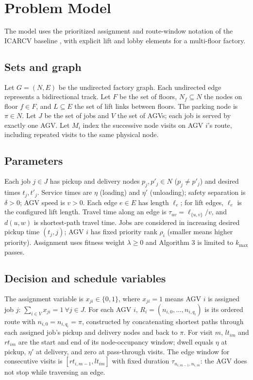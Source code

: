 \section{Problem Model}
\label{sec:model}

The model uses the prioritized assignment and route-window notation of the ICARCV baseline \cite{guo2024}, with explicit lift and lobby elements for a multi-floor factory.

\subsection{Sets and graph}
Let $G=(N,E)$ be the undirected factory graph. Each undirected edge represents a bidirectional track. Let $F$ be the set of floors, $N_f\subseteq N$ the nodes on floor $f\in F$, and $L\subseteq E$ the set of lift links between floors. The parking node is $\pi\in N$. Let $J$ be the set of jobs and $V$ the set of AGVs; each job is served by exactly one AGV. Let $M_i$ index the successive node visits on AGV $i$'s route, including repeated visits to the same physical node.

\subsection{Parameters}
Each job $j\in J$ has pickup and delivery nodes $p_j,p'_j\in N$ ($p_j\ne p'_j$) and desired times $t_j,t'_j$. Service times are $\eta$ (loading) and $\eta'$ (unloading); safety separation is $\delta>0$; AGV speed is $v>0$. Each edge $e\in E$ has length $\ell_e$; for lift edges, $\ell_e$ is the configured lift length. Travel time along an edge is $\tau_{uv}=\ell_{\{u,v\}}/v$, and $d(u,w)$ is shortest-path travel time. Jobs are considered in increasing desired pickup time $(t_j,j)$; AGV $i$ has fixed priority rank $\rho_i$ (smaller means higher priority). Assignment uses fitness weight $\lambda\ge0$ and Algorithm 3 is limited to $k_{\max}$ passes.

\subsection{Decision and schedule variables}
The assignment variable is $x_{ji}\in\{0,1\}$, where $x_{ji}=1$ means AGV $i$ is assigned job $j$: $\sum_{i\in V}x_{ji}=1\ \forall j\in J$. For each AGV $i$, $R_i=(n_{i,0},\ldots,n_{i,q_i})$ is its ordered route with $n_{i,0}=n_{i,q_i}=\pi$, constructed by concatenating shortest paths through each assigned job's pickup and delivery nodes and back to $\pi$. For visit $m$, $lt_{im}$ and $rt_{im}$ are the start and end of its node-occupancy window; dwell equals $\eta$ at pickup, $\eta'$ at delivery, and zero at pass-through visits. The edge window for consecutive visits is $[rt_{i,m-1},lt_{im}]$ with fixed duration $\tau_{n_{i,m-1},n_{i,m}}$: the AGV does not stop while traversing an edge.

